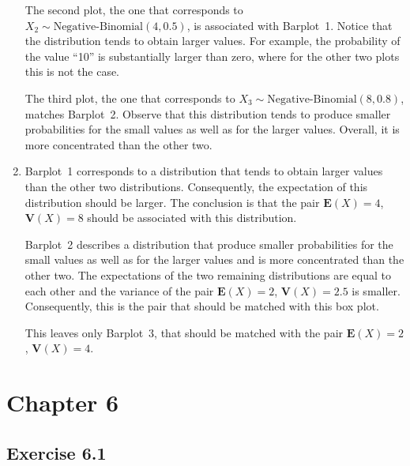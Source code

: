 \documentclass[
]{krantz}
\newcommand{\Expec}{\mathbf{E}}
\newcommand{\Var}{\mathbf{V}}
\theoremstyle{definition}
\theoremstyle{definition}
\theoremstyle{definition}
\theoremstyle{remark}
\begin{document}
\begin{enumerate}
  The second plot, the one that corresponds to
  \(X_2 \sim \mbox{Negative-Binomial}(4,0.5)\), is associated with
  Barplot~1. Notice that the distribution tends to obtain larger values.
  For example, the probability of the value ``10'' is substantially larger
  than zero, where for the other two plots this is not the case.

  The third plot, the one that corresponds to
  \(X_3 \sim \mbox{Negative-Binomial}(8,0.8)\), matches Barplot~2. Observe
  that this distribution tends to produce smaller probabilities for the
  small values as well as for the larger values. Overall, it is more
  concentrated than the other two.
\item
  Barplot~1 corresponds to a
  distribution that tends to obtain larger values than the other two
  distributions. Consequently, the expectation of this distribution should
  be larger. The conclusion is that the pair \(\Expec(X) = 4\),
  \(\Var(X) = 8\) should be associated with this distribution.

  Barplot~2 describes a distribution that produce smaller probabilities
  for the small values as well as for the larger values and is more
  concentrated than the other two. The expectations of the two remaining
  distributions are equal to each other and the variance of the pair
  \(\Expec(X) = 2\), \(\Var(X) = 2.5\) is smaller. Consequently, this is the
  pair that should be matched with this box plot.

  This leaves only Barplot~3, that should be matched with the pair
  \(\Expec(X) = 2\), \(\Var(X) = 4\).
\end{enumerate}

\hypertarget{chapter-6}{%
\section*{Chapter 6}\label{chapter-6}}


\hypertarget{exercise-6.1}{%
\subsection*{Exercise 6.1}\label{exercise-6.1}}
\end{document}
